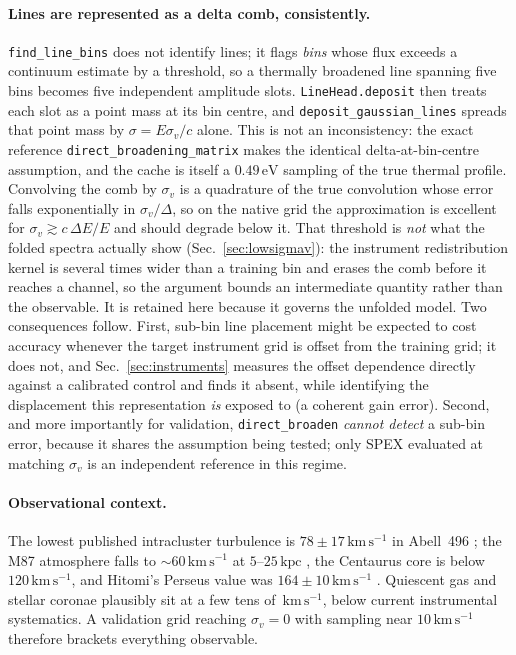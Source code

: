 \documentclass[11pt,a4paper]{article}
\newcommand{\kms}{\,\mathrm{km\,s^{-1}}}
\newcommand{\code}[1]{\texttt{#1}}
\begin{document}
\paragraph{Lines are represented as a delta comb, consistently.}
\code{find\_line\_bins} does not identify lines; it flags \emph{bins}
whose flux exceeds a continuum estimate by a threshold, so a thermally
broadened line spanning five bins becomes five independent amplitude
slots. \code{LineHead.deposit} then treats each slot as a point mass at
its bin centre, and \code{deposit\_gaussian\_lines} spreads that point
mass by $\sigma = E\sigma_v/c$ alone. This is not an inconsistency: the
exact reference \code{direct\_broadening\_matrix} makes the identical
delta-at-bin-centre assumption, and the cache is itself a
$0.49\,\mathrm{eV}$ sampling of the true thermal profile. Convolving the
comb by $\sigma_v$ is a quadrature of the true convolution whose error
falls exponentially in $\sigma_v/\Delta$, so on the native grid the
approximation is excellent for $\sigma_v \gtrsim c\,\Delta E/E$ and
should degrade below it. That threshold is \emph{not} what the folded
spectra actually show (Sec.~\ref{sec:lowsigmav}): the instrument
redistribution kernel is several times wider than a training bin and
erases the comb before it reaches a channel, so the argument bounds an
intermediate quantity rather than the observable. It is retained here
because it governs the unfolded model. Two consequences follow. First,
sub-bin line placement might be expected to cost accuracy whenever the
target instrument grid is offset from the training grid; it does not,
and Sec.~\ref{sec:instruments} measures the offset dependence directly
against a calibrated control and finds it absent, while identifying the
displacement this representation \emph{is} exposed to (a coherent gain
error). Second, and more importantly for
validation, \code{direct\_broaden} \emph{cannot detect} a sub-bin error,
because it shares the assumption being tested; only SPEX evaluated at
matching $\sigma_v$ is an independent reference in this regime.

\paragraph{Observational context.} The lowest published intracluster
turbulence is $78\pm17\kms$ in Abell~496 \citep{xrism_a496}; the M87
atmosphere falls to $\sim 60\kms$ at $5$--$25\,\mathrm{kpc}$
\citep{xrism_m87}, the Centaurus core is below $120\kms$, and Hitomi's
Perseus value was $164\pm10\kms$ \citep{hitomi16}. Quiescent gas and
stellar coronae plausibly sit at a few tens of $\kms$, below current
instrumental systematics. A validation grid reaching $\sigma_v = 0$ with
sampling near $10\kms$ therefore brackets everything observable.
\end{document}

